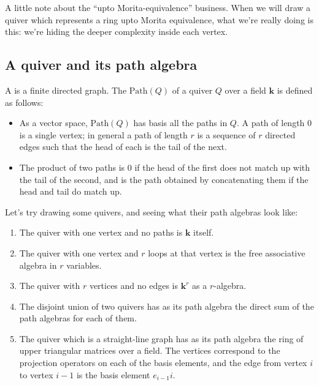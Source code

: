 \documentclass[a4paper]{amsart}
\newcommand{\field}{\mathbf{k}}
\newcommand{\pathalgebra}[1]{\text{Path}\left(#1\right)}
\begin{document}
A little note about the ``upto Morita-equivalence'' business. When we
will draw a quiver which represents a ring upto Morita equivalence,
what we're really doing is this: we're hiding the deeper complexity
inside each vertex.

\subsection{A quiver and its path algebra}

\begin{definer}
  A  is a finite directed graph. The
   $\pathalgebra{Q}$ of a quiver $Q$ over a field
  $\field$ is defined as follows:

  \begin{itemize}

  \item As a vector space, $\pathalgebra{Q}$ has basis all the paths in $Q$.
    A path of length $0$ is a single vertex; in general a path of
    length $r$ is a sequence of $r$ directed edges such that the head of
    each is the tail of the next.

  \item The product of two paths is $0$ if the head of the first does
    not match up with the tail of the second, and is the path obtained
    by concatenating them if the head and tail do match up.

  \end{itemize}
\end{definer}

Let's try drawing some quivers, and seeing what their path algebras
look like:

\begin{enumerate}

\item The quiver with one vertex and no paths is $\field$ itself.

\item The quiver with one vertex and $r$ loops at that vertex is the
  free associative algebra in $r$ variables.

\item The quiver with $r$ vertices and no edges is $\field^r$ as a $r$-algebra.

\item The disjoint union of two quivers has as its path algebra the
  direct sum of the path algebras for each of them.

\item The quiver which is a straight-line graph has as its path
  algebra the ring of upper triangular matrices over a field. The
  vertices correspond to the projection operators on each of the basis
  elements, and the edge from vertex $i$ to vertex $i-1$ is the basis
  element $e_{i-1}i$.

\end{enumerate}
\end{document}
